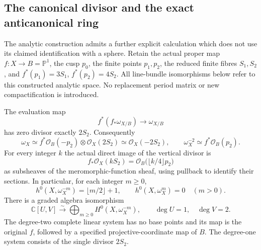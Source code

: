\subsection{The canonical divisor and the exact anticanonical ring}
\label{sec:canonical-ring-recovery}

The analytic construction admits a further explicit calculation which does
not use its claimed identification with a sphere. Retain the actual proper
map $f:X\to B=\mathbb P^1$, the cusp $p_0$, the finite points $p_1,p_2$,
the reduced finite fibres $S_1,S_2$, and
$f^*(p_1)=3S_1$, $f^*(p_2)=4S_2$. All line-bundle isomorphisms below
refer to this constructed analytic space. No replacement period matrix or
new compactification is introduced.

\begin{theorem}
\label{thm:canonical-ring-recovery}
The evaluation map
\[
 f^*(f_*\omega_{X/B})\longrightarrow\omega_{X/B}
\]
has zero divisor exactly $2S_2$. Consequently
\[
 \omega_X\simeq f^*\mathcal O_B(-p_2)\otimes\mathcal O_X(2S_2)
       \simeq\mathcal O_X(-2S_2),\qquad
 \omega_X^{-2}\simeq f^*\mathcal O_B(p_2).
 \tag{CR1}
\]
For every integer $k$ the actual direct image of the vertical divisor is
\[
 f_*\mathcal O_X(kS_2)
       =\mathcal O_B\bigl(\lfloor k/4\rfloor p_2\bigr)
 \tag{CR2}
\]
as subsheaves of the meromorphic-function sheaf, using pullback to identify
their sections. In particular, for each integer $m\geq0$,
\[
 h^0(X,\omega_X^{-m})=\lfloor m/2\rfloor+1,
 \qquad h^0(X,\omega_X^m)=0\quad(m>0).
 \tag{CR3}
\]
There is a graded algebra isomorphism
\[
 \mathbb C[U,V]\xrightarrow{\sim}
       \bigoplus_{m\geq0}H^0(X,\omega_X^{-m}),
       \qquad\deg U=1,\quad\deg V=2.
 \tag{CR4}
\]
The degree-two complete linear system has no base points and its map is
the original $f$, followed by a specified projective-coordinate map of $B$.
The degree-one system consists of the single divisor $2S_2$.
\end{theorem}

